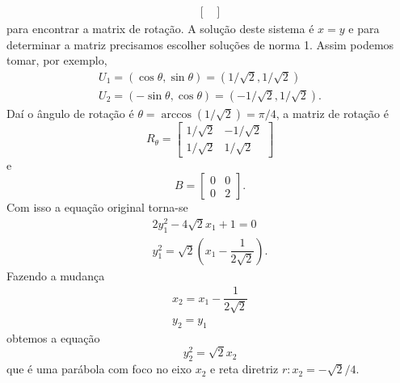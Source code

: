 \begin{exemplos}
\begin{enumerate}
\begin{solucao}
\begin{align*}
\begin{bmatrix}
        \end{bmatrix}
      \end{align*}
      para encontrar a matrix de rotação. A solução deste sistema é $x = y$ e para determinar a matriz precisamos escolher soluções de norma 1. Assim podemos tomar, por exemplo,
      \begin{align*}
        U_1 = (\cos\theta, \sin\theta) = (1/\sqrt{2}, 1/\sqrt{2})\\
        U_2 = (-\sin\theta, \cos\theta) = (-1/\sqrt{2}, 1/\sqrt{2}).
      \end{align*}
      Daí o ângulo de rotação é $\theta = \arccos(1/\sqrt{2}) = \pi/4$, a matriz de rotação é
      \[
        R_\theta = \begin{bmatrix}
          1/\sqrt{2} & -1/\sqrt{2}\\
          1/\sqrt{2} & 1/\sqrt{2}
        \end{bmatrix}
      \]
      e
      \[
        B = \begin{bmatrix}
          0 & 0\\
          0 & 2
        \end{bmatrix}.
      \]
      Com isso a equação original torna-se
      \begin{align*}
        2y_1^2 - 4\sqrt{2}x_1 + 1 = 0\\
        y_1^2 = \sqrt{2}\left(x_1 - \dfrac{1}{2\sqrt{2}}\right).
      \end{align*}
      Fazendo a mudança
      \begin{align*}
        x_2 = x_1 - \dfrac{1}{2\sqrt{2}}\\
        y_2 = y_1
      \end{align*}
      obtemos a equação
      \[
        y_2^2 = \sqrt{2}x_2
      \]
      que é uma parábola com foco no eixo $x_2$ e reta diretriz $r: x_2 = -\sqrt{2}/4$.
    \end{solucao}


\end{enumerate}
\end{exemplos}
